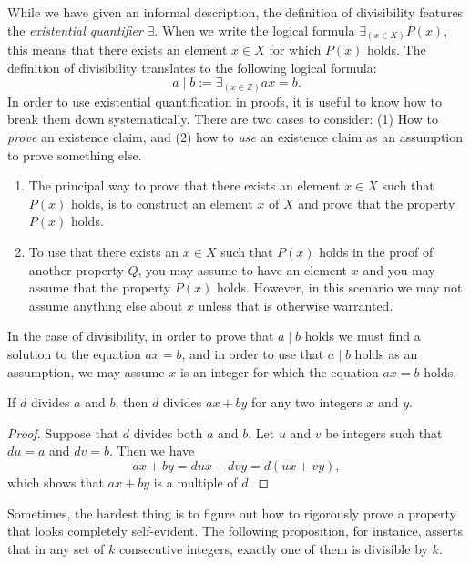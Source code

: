 \begin{remark}
  While we have given an informal description, the definition of divisibility features the \emph{existential quantifier} $\exists$. When we write the logical formula $\exists_{(x\in X)}P(x)$, this means that there exists an element $x\in X$ for which $P(x)$ holds. The definition of divisibility translates to the following logical formula:
  \begin{equation*}
    a\mid b := \exists_{(x\in\mathbb{Z})}ax=b.
  \end{equation*}
  In order to use existential quantification in proofs, it is useful to know how to break them down systematically. There are two cases to consider: (1) How to \emph{prove} an existence claim, and (2) how to \emph{use} an existence claim as an assumption to prove something else.
  \begin{enumerate}
  \item The principal way to prove that there exists an element $x\in X$ such that $P(x)$ holds, is to construct an element $x$ of $X$ and prove that the property $P(x)$ holds.
  \item To use that there exists an $x\in X$ such that $P(x)$ holds in the proof of another property $Q$, you may assume to have an element $x$ and you may assume that the property $P(x)$ holds. However, in this scenario we may not assume anything else about $x$ unless that is otherwise warranted.
  \end{enumerate}
  In the case of divisibility, in order to prove that $a\mid b$ holds we must find a solution to the equation $ax=b$, and in order to use that $a\mid b$ holds as an assumption, we may assume $x$ is an integer for which the equation $ax=b$ holds.
\end{remark}

\begin{proposition}
  If $d$ divides $a$ and $b$, then $d$ divides $ax+by$ for any two integers $x$ and $y$.
\end{proposition}

\begin{proof}
  Suppose that $d$ divides both $a$ and $b$. Let $u$ and $v$ be integers such that $du=a$ and $dv=b$. Then we have
  \begin{equation*}
    ax+by = dux + dvy = d(ux + vy),
  \end{equation*}
  which shows that $ax + by$ is a multiple of $d$.
\end{proof}

Sometimes, the hardest thing is to figure out how to rigorously prove a property that looks completely self-evident. The following proposition, for instance, asserts that in any set of $k$ consecutive integers, exactly one of them is divisible by $k$.

